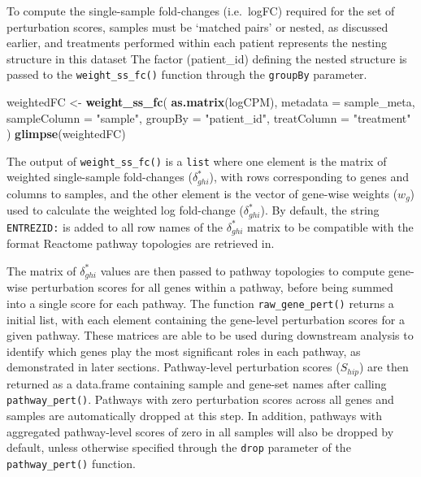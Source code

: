 \documentclass[9pt,a4paper,]{extarticle}
\newenvironment{Shaded}{\begin{snugshade}}{\end{snugshade}}
\newcommand{\AttributeTok}[1]{\textcolor[rgb]{0.13,0.29,0.53}{#1}}
\newcommand{\FunctionTok}[1]{\textcolor[rgb]{0.13,0.29,0.53}{\textbf{#1}}}
\newcommand{\NormalTok}[1]{#1}
\newcommand{\OtherTok}[1]{\textcolor[rgb]{0.56,0.35,0.01}{#1}}
\newcommand{\StringTok}[1]{\textcolor[rgb]{0.31,0.60,0.02}{#1}}
\begin{document}
To compute the single-sample fold-changes (i.e.~logFC) required for the set of perturbation scores, samples must be `matched pairs' or nested, as discussed earlier, and treatments performed within each patient represents the nesting structure in this dataset
The factor (patient\_id) defining the nested structure is passed to the \texttt{weight\_ss\_fc()} function through the \texttt{groupBy} parameter.

\begin{Shaded}
\begin{Highlighting}[]
\NormalTok{weightedFC }\OtherTok{\textless{}{-}} \FunctionTok{weight\_ss\_fc}\NormalTok{(}
  \FunctionTok{as.matrix}\NormalTok{(logCPM), }\AttributeTok{metadata =}\NormalTok{ sample\_meta,}
  \AttributeTok{sampleColumn =} \StringTok{"sample"}\NormalTok{, }\AttributeTok{groupBy =} \StringTok{"patient\_id"}\NormalTok{, }\AttributeTok{treatColumn =} \StringTok{"treatment"}
\NormalTok{)}
\FunctionTok{glimpse}\NormalTok{(weightedFC)}
\end{Highlighting}
\end{Shaded}

The output of \texttt{weight\_ss\_fc()} is a \texttt{list} where one element is the matrix of weighted single-sample fold-changes (\(\delta_{ghi}^*\)), with rows corresponding to genes and columns to samples, and the other element is the vector of gene-wise weights (\(w_g\)) used to calculate the weighted log fold-change (\(\delta_{ghi}^*\)).
By default, the string \texttt{ENTREZID:} is added to all row names of the \(\delta_{ghi}^*\) matrix to be compatible with the format Reactome pathway topologies are retrieved in.

The matrix of \(\delta_{ghi}^*\) values are then passed to pathway topologies to compute gene-wise perturbation scores for all genes within a pathway, before being summed into a single score for each pathway.
The function \texttt{raw\_gene\_pert()} returns a initial list, with each element containing the gene-level perturbation scores for a given pathway.
These matrices are able to be used during downstream analysis to identify which genes play the most significant roles in each pathway, as demonstrated in later sections.
Pathway-level perturbation scores (\(S_{hip}\)) are then returned as a data.frame containing sample and gene-set names after calling \texttt{pathway\_pert()}.
Pathways with zero perturbation scores across all genes and samples are automatically dropped at this step.
In addition, pathways with aggregated pathway-level scores of zero in all samples will also be dropped by default, unless otherwise specified through the \texttt{drop} parameter of the \texttt{pathway\_pert()} function.
\end{document}
